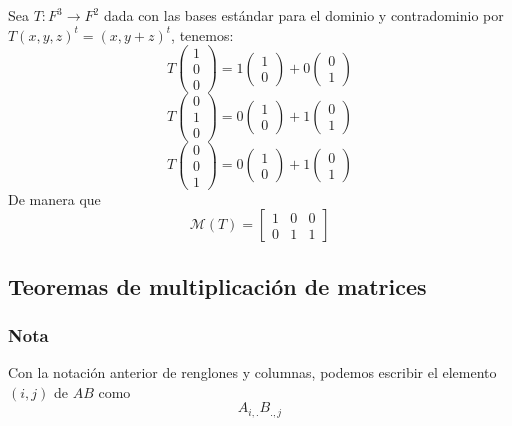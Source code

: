 \documentclass{article}
\begin{document}
Sea $T:F^3\rightarrow F^2$ dada con las bases estándar para el dominio y
contradominio por $T(x,y,z)^t = (x,y + z)^t$, tenemos:
{
$$T\begin{pmatrix}
    1\\
    0\\
    0    
\end{pmatrix}
 = 
 1\begin{pmatrix}
    1\\
    0
 \end{pmatrix}
 +0\begin{pmatrix}
    0\\
    1
 \end{pmatrix}
 $$
 $$T\begin{pmatrix}
    0\\
    1\\
    0
 \end{pmatrix}
 =
 0\begin{pmatrix}
    1\\
    0
 \end{pmatrix}
 +1\begin{pmatrix}
    0\\
    1
 \end{pmatrix}
 $$
 $$
 T\begin{pmatrix}
    0\\
    0\\
    1
 \end{pmatrix}
 =
 0\begin{pmatrix}
    1\\
    0
 \end{pmatrix}
 +
 1\begin{pmatrix}
    0\\
    1
 \end{pmatrix}
 $$
}
De manera que
$$\mathcal{M}(T) = \begin{bmatrix}
    1 & 0 & 0\\
    0 & 1 & 1
\end{bmatrix}$$

\subsection{Teoremas de multiplicación de matrices}
\subsubsection*{Nota}
Con la notación anterior de renglones y columnas, podemos
escribir el elemento $(i,j)$ de $AB$ como
$$A_{i,.} B_{.,j}$$
\end{document}
